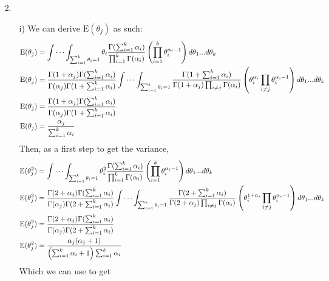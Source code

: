 \documentclass[11pt]{article}
\newcommand{\E}{\mathrm{E}}
\theoremstyle{definition}
\begin{document}
\begin{itemize}
\begin{itemize}
        \end{itemize}
    \item[2.]
        \begin{itemize}
            \item[i)]
                We can derive $\E(\theta_j)$ as such:
                \begin{align*}
                    \E(\theta_j) &= \idotsint_{\sum_{i=1}^k\theta_i=1}\theta_i \frac{\Gamma(\sum_{i=1}^k\alpha_i)}{\prod_{i=1}^k\Gamma(\alpha_i)} \left(\prod_{i=1}^{k}\theta_i^{\alpha_i-1}\right)d\theta_1...d\theta_k \\
                    \E(\theta_j) &= \frac{\Gamma(1+\alpha_j)\Gamma(\sum_{i=1}^k\alpha_i)}{\Gamma(\alpha_j)\Gamma(1+\sum_{i=1}^k\alpha_i)}   \idotsint_{\sum_{i=1}^k\theta_i=1}\frac{\Gamma(1+\sum_{i=1}^k\alpha_i)}{\Gamma(1+\alpha_j)\prod_{i\neq j}\Gamma(\alpha_i)} \left(\theta_i^{\alpha_i}\prod_{i\neq j}\theta_i^{\alpha_i-1}\right)d\theta_1...d\theta_k \\
                    \E(\theta_j) &= \frac{\Gamma(1+\alpha_j)\Gamma(\sum_{i=1}^k\alpha_i)}{\Gamma(\alpha_j)\Gamma(1+\sum_{i=1}^k\alpha_i)}\\
                    \E(\theta_j) &= \frac{\alpha_j}{\sum_{i=1}^k\alpha_i}\\
                \end{align*}
                Then, as a first step to get the variance,
                \begin{align*}
                    \E(\theta_j^2) &= \idotsint_{\sum_{i=1}^k\theta_i=1} \theta_i^2 \frac{\Gamma(\sum_{i=1}^k\alpha_i)}{\prod_{i=1}^k\Gamma(\alpha_i)} \left(\prod_{i=1}^{k}\theta_i^{\alpha_i-1}\right)d\theta_1...d\theta_k \\
                    \E(\theta_j^2) &= \frac{\Gamma(2+\alpha_j)\Gamma(\sum_{i=1}^k\alpha_i)}{\Gamma(\alpha_j)\Gamma(2+\sum_{i=1}^k\alpha_i)}   \idotsint_{\sum_{i=1}^k\theta_i=1}\frac{\Gamma(2+\sum_{i=1}^k\alpha_i)}{\Gamma(2+\alpha_j)\prod_{i\neq j}\Gamma(\alpha_i)} \left(\theta_i^{1+\alpha_i}\prod_{i\neq j}\theta_i^{\alpha_i-1}\right)d\theta_1...d\theta_k \\
                    \E(\theta_j^2) &= \frac{\Gamma(2+\alpha_j)\Gamma(\sum_{i=1}^k\alpha_i)}{\Gamma(\alpha_j)\Gamma(2+\sum_{i=1}^k\alpha_i)}\\
                    \E(\theta_j^2) &= \frac{\alpha_j(\alpha_j+1)}{\left(\sum_{i=1}^k\alpha_i+1\right)\sum_{i=1}^k\alpha_i}\\
                \end{align*}
                Which we can use to get

\end{itemize}
\end{itemize}
\end{document}
